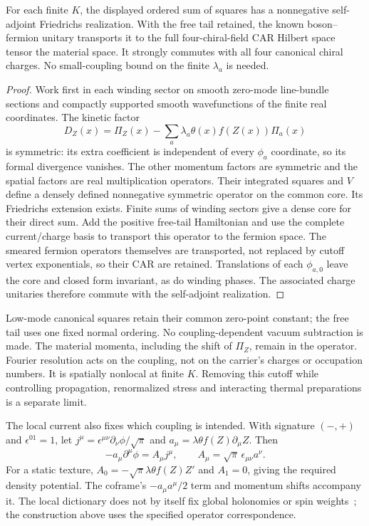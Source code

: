 \begin{proposition}
\label{prop:charged-material-regulator}
For each finite $K$, the displayed ordered sum of squares has a
nonnegative self-adjoint Friedrichs realization. With the free tail
retained, the known boson--fermion unitary transports it to the full
four-chiral-field CAR Hilbert space tensor the material space.
It strongly commutes with all four canonical chiral charges.
No small-coupling bound on the finite $\lambda_a$ is needed.
\end{proposition}
\begin{proof}
Work first in each winding sector on smooth zero-mode line-bundle
sections and compactly supported smooth wavefunctions of the finite
real coordinates. The kinetic factor
\[
 D_Z(x)=\Pi_Z(x)-\sum_a\lambda_a\theta(x)f(Z(x))\Pi_a(x)
\]
is symmetric: its extra coefficient is independent of every $\phi_a$
coordinate, so its formal divergence vanishes. The other momentum
factors are symmetric and the spatial factors are real multiplication
operators. Their integrated squares and $V$ define a densely defined
nonnegative symmetric operator on the common core. Its Friedrichs
extension exists. Finite sums of winding sectors give a dense core
for their direct sum. Add the positive free-tail Hamiltonian and use
the complete current/charge basis to transport this operator to the
fermion space. The smeared fermion operators themselves are transported,
not replaced by cutoff vertex exponentials, so their CAR are retained.
Translations of each $\phi_{a,0}$ leave the core and closed form
invariant, as do winding phases. The associated charge unitaries
therefore commute with the self-adjoint realization.
\end{proof}

Low-mode canonical squares retain their common zero-point constant;
the free tail uses one fixed normal ordering. No coupling-dependent
vacuum subtraction is made. The material momenta, including the
shift of $\Pi_Z$, remain in the operator. Fourier resolution acts
on the coupling, not on the carrier's charges or occupation numbers.
It is spatially nonlocal at finite $K$. Removing this cutoff while
controlling propagation, renormalized stress and interacting thermal
preparations is a separate limit.

The local current also fixes which coupling is intended. With signature
$(-,+)$ and $\epsilon^{01}=1$, let
$j^\mu=\epsilon^{\mu\nu}\partial_\nu\phi/\sqrt\pi$ and
$a_\mu=\lambda\theta f(Z)\partial_\mu Z$. Then
\[
 -a_\mu\partial^\mu\phi=A_\mu j^\mu,
 \qquad A_\mu=\sqrt\pi\,\epsilon_{\mu\nu}a^\nu.
\]
For a static texture, $A_0=-\sqrt\pi\lambda\theta f(Z)Z'$ and
$A_1=0$, giving the required density potential. The coframe's
$-a_\mu a^\mu/2$ term and momentum shifts accompany it.
The local dictionary does not by itself fix global holonomies or
spin weights~\cite[Eq.~(9) and Section~III]{YaoFukusumi2019};
the construction above uses the specified operator correspondence.

